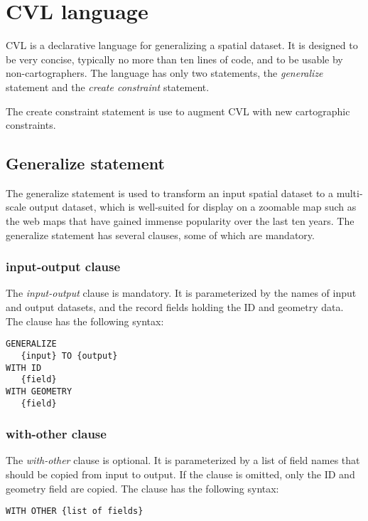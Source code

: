 \section{CVL language}
\label{sec:cvl-language}
CVL is a declarative language for generalizing a spatial dataset. It is designed to be very concise, typically no more than ten lines of code, and to be usable by non-cartographers. The language has only two statements, the \emph{generalize} statement and the \emph{create constraint} statement. 



The create constraint statement is use to augment CVL with new cartographic constraints.

\subsection{Generalize statement}
The generalize statement is used to transform an input spatial dataset to a multi-scale output dataset, which is well-suited for display on a zoomable map such as the web maps that have gained immense popularity over the last ten years. The generalize statement has several clauses, some of which are mandatory. 

\subsubsection{input-output clause}

The \emph{input-output} clause is mandatory. It is parameterized by the names of input and output datasets, and the record fields holding the ID and geometry data. The clause has the following syntax:

\begin{lstlisting}
GENERALIZE 
   {input} TO {output}
WITH ID
   {field}
WITH GEOMETRY 
   {field}
\end{lstlisting}

\subsubsection{with-other clause}

The \emph{with-other} clause is optional. It is parameterized by a list of field names that should be copied from input to output. If the clause is omitted, only the ID and geometry field are copied. The clause has the following syntax:

\begin{lstlisting}
WITH OTHER {list of fields}
\end{lstlisting}

